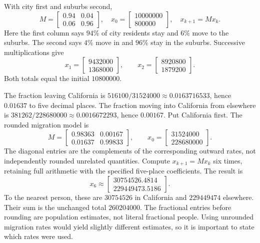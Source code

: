 With city first and suburbs second,
\[
 M=\begin{bmatrix}0.94&0.04\\0.06&0.96\end{bmatrix},\quad
 x_0=\begin{bmatrix}10000000\\800000\end{bmatrix},\quad x_{k+1}=Mx_k.
\]
Here the first column says $94\%$ of city residents stay and
$6\%$ move to the suburbs. The second says $4\%$ move in and
$96\%$ stay in the suburbs. Successive multiplications give
\[
 x_1=\begin{bmatrix}9432000\\1368000\end{bmatrix},\qquad
 x_2=\begin{bmatrix}8920800\\1879200\end{bmatrix}.
\]
Both totals equal the initial $10800000$.

The fraction leaving California is
$516100/31524000\approx0.0163716533$, hence $0.01637$ to five
decimal places. The fraction moving into California from elsewhere
is $381262/228680000\approx0.0016672293$, hence $0.00167$.
Put California first. The rounded migration model is
\[
 M=\begin{bmatrix}0.98363&0.00167\\0.01637&0.99833\end{bmatrix},\qquad
 x_0=\begin{bmatrix}31524000\\228680000\end{bmatrix}.
\]
The diagonal entries are the complements of the corresponding
outward rates, not independently rounded unrelated quantities.
Compute $x_{k+1}=Mx_k$ six times, retaining full arithmetic with
the specified five-place coefficients. The result is
\[
 x_6\approx\begin{bmatrix}30754526.4814\\229449473.5186\end{bmatrix}.
\]
To the nearest person, these are $30754526$ in California and
$229449474$ elsewhere. Their sum is the unchanged total $260204000$.
The fractional entries before rounding are population estimates, not
literal fractional people. Using unrounded migration rates would yield
slightly different estimates, so it is important to state which rates were used.

